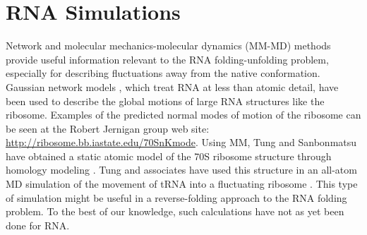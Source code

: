 \section{RNA Simulations}
Network  and molecular  mechanics-molecular  dynamics (MM-MD)  methods
provide  useful  information  relevant  to the  RNA  folding-unfolding
problem, especially  for describing fluctuations away  from the native
conformation.   Gaussian network  models  \cite{y_wang2004, bahar1998,
  wang2005}, which  treat RNA  at less than  atomic detail,  have been
used to describe  the global motions of large  RNA structures like the
ribosome.  Examples  of the  predicted normal modes  of motion  of the
ribosome  can  be  seen  at   the  Robert  Jernigan  group  web  site:
\url{http://ribosome.bb.iastate.edu/70SnKmode}.   Using  MM, Tung  and
Sanbonmatsu have  obtained a static  atomic model of the  70S ribosome
structure  through   homology  modeling  \cite{tung2004}.    Tung  and
associates have  used this structure  in an all-atom MD  simulation of
the    movement    of     tRNA    into    a    fluctuating    ribosome
\cite{sanbonmatsu2005}.  This type of  simulation might be useful in a
reverse-folding approach to  the RNA folding problem.  To  the best of
our knowledge, such calculations have not as yet been done for RNA.

